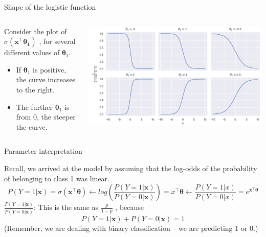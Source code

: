 \documentclass[aspectratio=169]{../latex_main/tntbeamer}  %
\begin{document}
	\begin{frame}{Shape of the logistic function}
	   
	   \begin{columns}
	    
	   \begin{column}{.4\textwidth}
	   Consider the plot of       $\sigma (\bm{x}^\intercal\bm{\theta_1})$      , for several different values of $\bm\theta_1$. 
	   \begin{itemize}
	       \item If $\bm\theta_1$ is positive, the curve increases to the right.
	       \item The further  $\bm\theta_1$ is from 0, the steeper the curve.
	   \end{itemize}
	   \end{column}
	    
	    \begin{column}{.6\textwidth}

	            \centering	            \includegraphics[width=\textwidth]{Bild10}
	            
	    \end{column}
	    
	    \end{columns}
	\end{frame}
	
	
	\begin{frame}{Parameter interpretation}
	   
	   Recall, we arrived at the model by assuming that the log-odds of the probability of belonging to class 1 was linear.
	   \begin{equation*}
	       P(Y=1|\bm{x}) = \sigma(\bm{x}^\intercal\bm{\theta}) \leftarrow log\left(\frac{P(Y=1|\bm{x})}{P(Y=0|\bm{x})}\right) = x^\intercal\bm{\theta} \leftarrow \frac{P(Y=1|x)}{P(Y=0|x)} = e^{\bm{x}^\intercal \bm{\theta}}
	   \end{equation*}
	   $\frac{P(Y=1|\bm{x})}{P(Y=0|\bm{x})}$: This is the same as     $\frac{p}{1-p}$          , because
        \begin{equation*}
            P(Y=1|\bm{x}) + P(Y=0|\bm{x}) = 1
        \end{equation*}
        (Remember, we are dealing with binary classification – we are predicting 1 or 0.)
	\end{frame}
	
\end{document}

